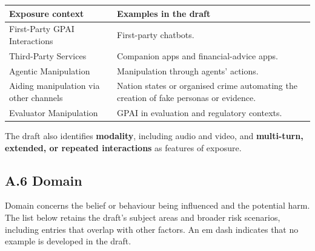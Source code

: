 \documentclass[
  english,
]{article}
\newcounter{none} %
\begin{document}
{\def\LTcaptype{none} %
\begin{longtable}[]{@{}
  >{\raggedright\arraybackslash}p{}
  >{\raggedright\arraybackslash}p{}@{}}
\toprule\noalign{}
\begin{minipage}[b]{\linewidth}\raggedright
Exposure context
\end{minipage} & \begin{minipage}[b]{\linewidth}\raggedright
Examples in the draft
\end{minipage} \\
\midrule\noalign{}
\endhead
\bottomrule\noalign{}
\endlastfoot
First-Party GPAI Interactions & First-party chatbots. \\
Third-Party Services & Companion apps and financial-advice apps. \\
Agentic Manipulation & Manipulation through agents' actions. \\
Aiding manipulation via other channels & Nation states or organised
crime automating the creation of fake personas or evidence. \\
Evaluator Manipulation & GPAI in evaluation and regulatory contexts. \\
\end{longtable}
}

The draft also identifies \textbf{modality}, including audio and video,
and \textbf{multi-turn, extended, or repeated interactions} as features
of exposure.

\subsection*{A.6 Domain}\label{a.6-domain}

Domain concerns the belief or behaviour being influenced and the
potential harm. The list below retains the draft's subject areas and
broader risk scenarios, including entries that overlap with other
factors. An em dash indicates that no example is developed in the draft.
\end{document}
